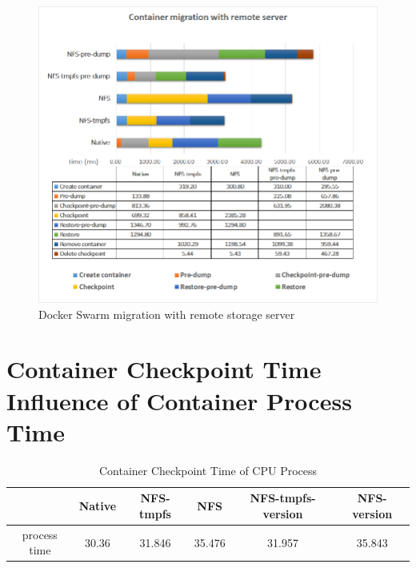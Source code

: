 \begin{figure}[h]
\includegraphics[width=17cm]{figure/migration_time.png}
\caption{Docker Swarm migration with remote storage server}
\label{fig:Docker Swarm migration with remote storage server}
\end{figure}

\section{Container Checkpoint Time Influence of Container Process Time}

\begin{table}[h]
\begin{center}
\begin{tabular}{|c|c|c|c|c|c|} \hline
& Native & NFS-tmpfs & NFS & NFS-tmpfs-version & NFS-version \\ \hline
process time & 30.36 & 31.846 & 35.476 & 31.957 & 35.843 \\ \hline
\end{tabular}
\end{center}
\caption{Container Checkpoint Time of CPU Process}
\label{talbe:Checkpoint Time of CPU}
\end{table}


